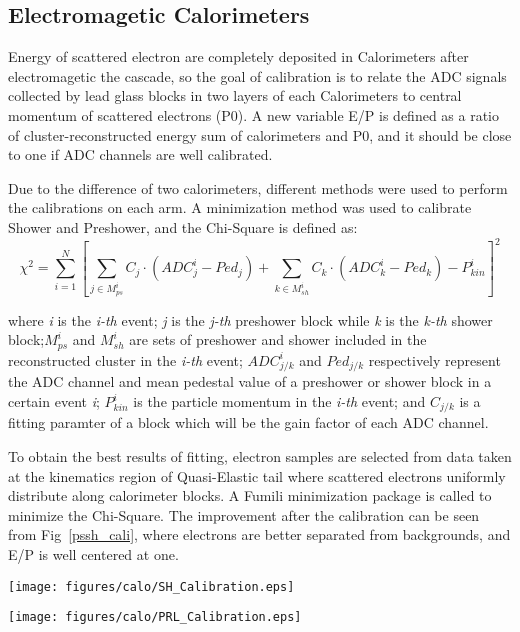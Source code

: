 \subsection{Electromagetic Calorimeters}

 Energy of scattered electron are completely deposited in Calorimeters after electromagetic the cascade, so the goal of calibration is to relate the ADC signals collected by lead glass blocks in two layers of each Calorimeters to central momentum of scattered electrons (P0). A new variable E/P is defined as a ratio of cluster-reconstructed energy sum of calorimeters and P0, and it should be close to one if ADC channels are well calibrated.


 Due to the difference of two calorimeters, different methods were used to perform the calibrations on each arm. A minimization method was used to calibrate Shower and Preshower\cite{shower_ak}, and the Chi-Square is defined as: 
\begin{equation}
 \chi^{2} = \sum_{i=1}^{N}[\sum_{j\in M_{ps}^{i}}C_{j}\cdot (ADC_{j}^{i}-Ped_{j})+\sum_{k\in M_{sh}^{i}}C_{k}\cdot (ADC_{k}^{i}-Ped_{k})-P_{kin}^{i}]^{2}
\end{equation}

where \emph{i} is the \emph{i-th} event; \emph{j} is the \emph{j-th} preshower block while \emph{k} is the \emph{k-th} shower block;$M_{ps}^{i}$ and $M_{sh}^{i}$ are sets of preshower and shower included in the reconstructed cluster in the \emph{i-th} event; $ADC_{j/k}^{i}$ and $Ped_{j/k}$ respectively represent the ADC channel and mean pedestal value of a preshower or shower block in a certain event \emph{i}; $P_{kin}^{i}$ is the particle momentum in the \emph{i-th} event; and $C_{j/k}$ is a fitting paramter of a block which will be the gain factor of each ADC channel.

 To obtain the best results of fitting, electron samples are selected from data taken at the kinematics region of Quasi-Elastic tail where scattered electrons uniformly distribute along calorimeter blocks. A Fumili minimization package \cite{shower_luhj} is called to minimize the Chi-Square. The improvement after the calibration can be seen from Fig~\ref{pssh_cali}, where electrons are better separated from backgrounds, and  E/P is well centered at one. 

\parbox[t]{0.45\textwidth}{
 \texttt{[image: figures/calo/SH\_Calibration.eps]}
 \label{pssh_cali}
}
\hfill
\parbox[t]{0.45\textwidth}{
\texttt{[image: figures/calo/PRL\_Calibration.eps]}
}

